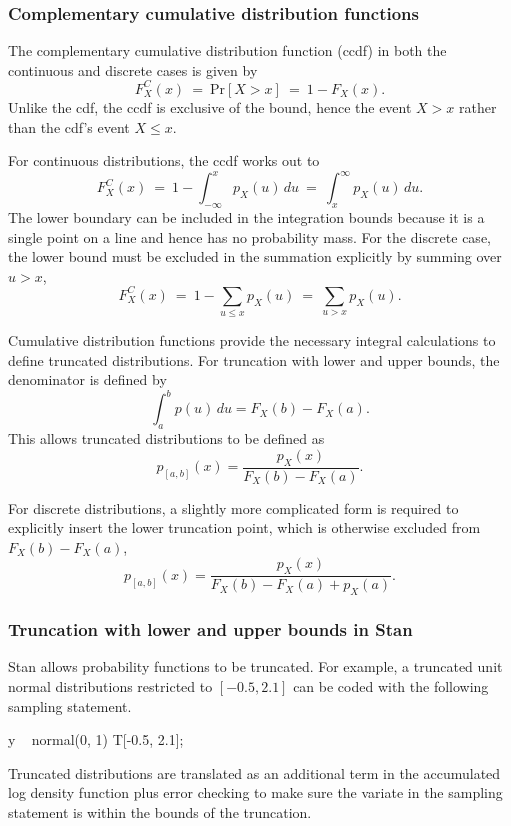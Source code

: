 \subsubsection{Complementary cumulative distribution functions}

The complementary cumulative distribution function (ccdf) in both the
continuous and discrete cases is given by
\[
F^C_X(x)
\ = \ \mbox{Pr}[X > x]
\ = \ 1 - F_X(x).
\]
Unlike the cdf, the ccdf is exclusive of the bound, hence the event
$X > x$ rather than the cdf's event $X \leq x$.

For continuous distributions, the ccdf works out to
\[
F^C_X(x)
\ = \ 1 - \int_{-\infty}^x p_X(u) \, du
\ = \ \int_x^{\infty} p_X(u) \, du.
\]
The lower boundary can be included in the integration bounds because
it is a single point on a line and hence has no probability mass.
For the discrete case, the lower bound must be excluded in the
summation explicitly by summing over $u > x$,
\[
F^C_X(x)
\ = \ 1 - \sum_{u \leq x} p_X(u)
\ = \ \sum_{u > x} p_X(u).
\]


Cumulative distribution functions provide the necessary integral
calculations to define truncated distributions.  For truncation with
lower and upper bounds, the denominator is defined by
\[
\int_a^b p(u) \, du = F_X(b) - F_X(a).
\]
This allows truncated distributions to be defined as
\[
p_{[a,b]}(x) = \frac{p_X(x)}
                  {F_X(b) - F_X(a)}.
\]

For discrete distributions, a slightly more complicated form is
required to explicitly insert the lower truncation point, which is
otherwise excluded from $F_X(b) - F_X(a)$,
\[
p_{[a,b]}(x) = \frac{p_X(x)}
                  {F_X(b) - F_X(a) + p_X(a)}.
\]

\subsubsection{Truncation with lower and upper bounds in Stan}

Stan allows probability functions to be truncated.  For example, a
truncated unit normal distributions restricted to $[-0.5, 2.1]$
can be coded with the following sampling statement.
%
\begin{stancode}
y ~ normal(0, 1) T[-0.5, 2.1];
\end{stancode}
%
Truncated distributions are translated as an additional term in the
accumulated log density function plus error checking to make sure the
variate in the sampling statement is within the bounds of the
truncation.

